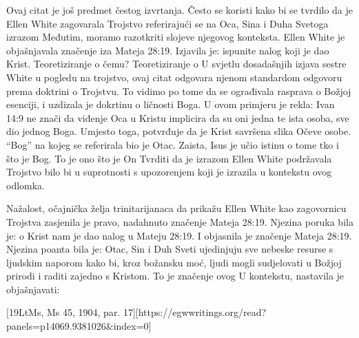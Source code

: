 Ovaj citat je još predmet čestog izvrtanja. Često se koristi kako bi se tvrdilo da je Ellen White zagovarala Trojstvo referirajući se na Oca, Sina i Duha Svetoga izrazom  Međutim, moramo razotkriti slojeve njegovog konteksta. Ellen White je objašnjavala značenje iza Mateja 28:19. Izjavila je:  ispunite nalog koji je dao Krist. Teoretiziranje o čemu? Teoretiziranje o  U svjetlu dosadašnjih izjava sestre White u pogledu na trojstvo, ovaj citat odgovara njenom standardom odgovoru prema doktrini o Trojstvu. To vidimo po tome da se ograđivala rasprava o Božjoj esenciji, i uzdizala je dokrtinu o ličnosti Boga. U ovom primjeru je rekla:  Ivan 14:9 ne znači da viđenje Oca u Kristu implicira da su oni jedna te ista osoba, sve dio jednog Boga. Umjesto toga, potvrđuje da je Krist savršena slika Očeve osobe. “Bog” na kojeg se referirala bio je Otac. Zaista, Isus je učio istinu o tome tko i što je Bog. To je ono što je On   Tvrditi da je izrazom  Ellen White podržavala Trojstvo bilo bi u suprotnosti s upozorenjem koji je izrazila u kontekstu ovog odlomka.

Nažalost, očajnička želja trinitarijanaca da prikažu Ellen White kao zagovornicu Trojstva zasjenila je pravo, nadahnuto značenje Mateja 28:19. Njezina poruka bila je:  o  Krist nam je dao nalog u Mateju 28:19. I objasnila je značenje Mateja 28:19. Njezina poanta bila je: Otac, Sin i Duh Sveti ujedinjuju sve nebeske resurse s ljudskim naporom kako bi, kroz božansku moć, ljudi mogli sudjelovati u Božjoj prirodi i raditi zajedno s Kristom. To je značenje ovog  U kontekstu, nastavila je objašnjavati:

[19LtMs, Ms 45, 1904, par. 17][https://egwwritings.org/read?panels=p14069.9381026&index=0]

